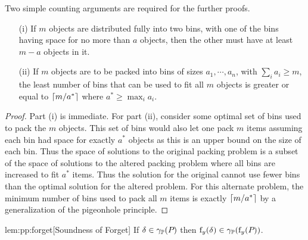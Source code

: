 \begin{remark}\label{thm:pp:project:counting}
Two simple counting arguments are required for the further proofs.

\begin{itemize}
\item[(i)] If $ m $ objects are distributed fully into two bins, with one
of the bins having space for no more than $ a $ objects, then the
other must have at least $ m - a $ objects in it.
\item[(ii)] If $ m $ objects are to be packed into bins of sizes $
a_1, \cdots, a_n $, with $ \sum_{i} a_i \geq m $, the least number of
bins that can be used to fit all $ m $ objects is greater or equal to
$ \lceil m / a^* \rceil $ where $ a^* \geq \max_i a_i $.
\end{itemize}
\end{remark}

\begin{proof} Part (i) is immediate. For part (ii), consider some
optimal set of bins used to pack the $ m $ objects. This set of
bins would also let one pack $ m $ items assuming each bin had space
for exactly $ a^* $ objects as this is an upper bound on the size of
each bin. Thus the space of solutions to the original packing problem
is a subset of the space of solutions to the altered packing problem
where all bins are increased to fit $ a^* $ items. Thus the solution
for the original cannot use fewer bins than the optimal solution for
the altered problem. For this alternate problem, the minimum number of bins used
to pack all $ m $ items is exactly $ \lceil m / a^* \rceil $ by a
generalization of the pigeonhole principle.
\end{proof}

\begin{replemma}{lem:pp:forget}[Soundness of Forget]
If $\delta \in \gamma_{\mathbb{P}}(P_{})$ then $\mathrm{f}_{y}(\delta) \in \gamma_{\mathbb{P}}(\mathrm{f}_{y}(P_{}))$.
\end{replemma}

